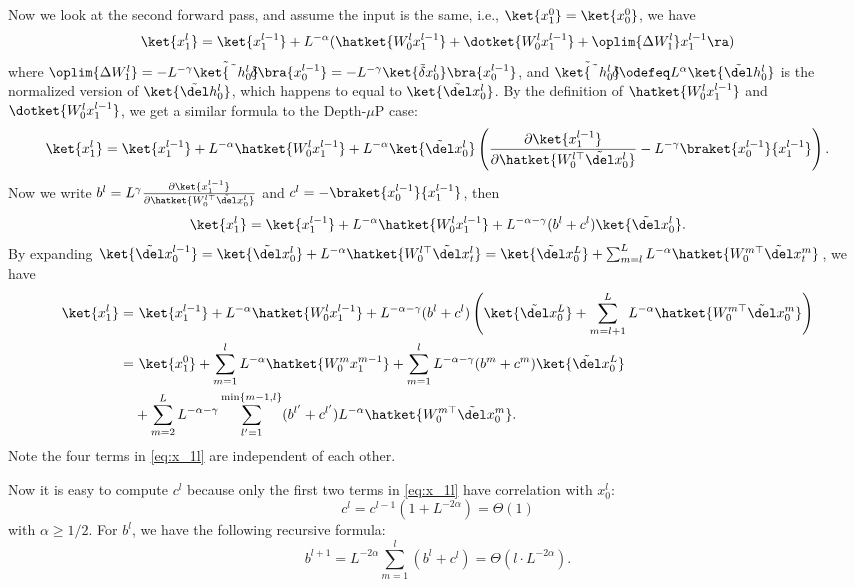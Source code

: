 Now we look at the second forward pass, and assume the input is the same, i.e., $\ket{x_1^0}=\ket{x_0^0}$, we have
\[\ket{x_1^l} = \ket{x_1^{l-1}} + L^{-\alpha} (\hatket{W_0^l x_1^{l-1}} + \dotket{W_0^l x_1^{l-1}}+ \oplim{\Delta W_1^l} x_1^{l-1}\ra)\]
where $\oplim{\Delta W_1^l}= -L^{-\gamma} \Tilde{\ket{\tilde \delta h_0^l}}\bra{x_0^{l-1}}=-L^{-\gamma} \ket{\tilde \delta x_0^l}\bra{x_0^{l-1}}$, and $\Tilde{\ket{\tilde \delta h_0^l}}\odefeq L^{\alpha} \ket{\tilde \del h_0^l}$ is the normalized version of $\ket{\tilde \del h_0^l}$, which happens to equal to $\ket{\tilde \del x_0^l}$. By the definition of $\hatket{W_0^l x_1^{l-1}}$ and $\dotket{W_0^l x_1^{l-1}}$, we get a similar formula to the Depth-$\mu$P case:
\[\ket{x_1^l} = \ket{x_1^{l-1}} + L^{-\alpha} \hatket{W_0^l x_1^{l-1}} + L^{-\alpha} \ket{\tilde \del x_0^{l}} \left(\frac{\partial \ket{x_1^{l-1}}}{\partial \hatket{W_0^{l\top} \tilde \del x_0^{l}}} - L^{-\gamma} \braket{x_0^{l-1}}{x_1^{l-1}} \right).\]
Now we write $b^l=L^{\gamma} \frac{\partial \ket{x_1^{l-1}}}{\partial \hatket{W_0^{l\top} \tilde \del x_0^{l}}}$ and $c^l=- \braket{x_0^{l-1}}{x_1^{l-1}}$, then
\[\ket{x_1^{l}}=\ket{x_1^{l-1}} + L^{-\alpha} \hatket{W_0^l x_1^{l-1}} + L^{-\alpha-\gamma}(b^l + c^l)\ket{\tilde \del x_0^l}.\]
By expanding $\ket{\tilde \del x_0^{l-1}}=\ket{\tilde \del x_0^{l}} + L^{-\alpha} \hatket{W_0^{l\top}\tilde \del x_t^l}=\ket{\tilde \del x_0^L} + \sum_{m=l}^L L^{-\alpha} \hatket{W_0^{m\top}\tilde \del x_t^m}$, 
we have 
\begin{align}
    \ket{x_1^{l}}=&~\ket{x_1^{l-1}} + L^{-\alpha} \hatket{W_0^l x_1^{l-1}} + L^{-\alpha-\gamma}(b^l + c^l)\left(\ket{\tilde \del x_0^L} + \sum_{m=l+1}^L L^{-\alpha} \hatket{W_0^{m\top}\tilde \del x_0^m}\right) \nonumber \\
    =&~ \ket{x_1^{0}} + \sum_{m=1}^l L^{-\alpha} \hatket{W_0^m x_1^{m-1}} + \sum_{m=1}^l L^{-\alpha-\gamma} (b^m +c^m)\ket{\tilde \del x_0^L} \nonumber\\
    & + \sum_{m=2}^L L^{-\alpha-\gamma} \sum_{l'=1}^{\min\{m-1,l\}} (b^{l'}+c^{l'}) L^{-\alpha} \hatket{W_0^{m\top}\tilde \del x_0^m}.\label{eq:x_1l}
\end{align}
Note the four terms in \cref{eq:x_1l} are independent of each other.

Now it is easy to compute $c^l$ because only the first two terms in \cref{eq:x_1l} have correlation with $x_0^l$:
\[c^l =c^{l-1} (1+ L^{-2\alpha})=\Theta(1)\]
with $\alpha \geq 1/2$.
For $b^l$, we have the following recursive formula:
\[b^{l+1}=L^{-2\alpha} \sum_{m=1}^l (b^l+c^l)=\Theta(l\cdot L^{-2\alpha}).\]

